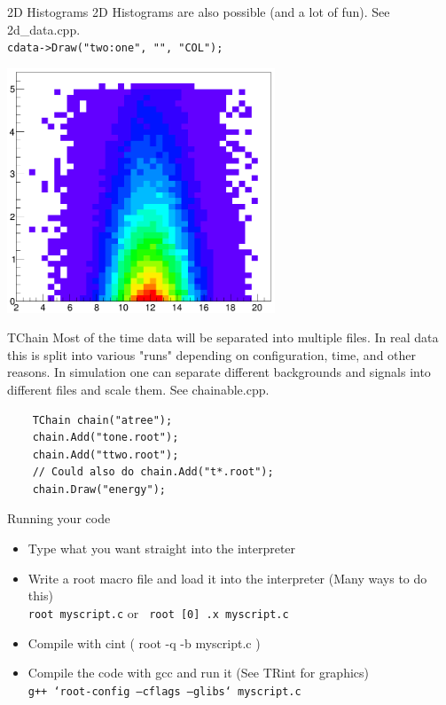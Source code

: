 \documentclass[xcolor=svgnames]{beamer}
\begin{document}
\begin{frame}{2D Histograms}
  2D Histograms are also possible (and a lot of fun). See 2d\_data.cpp.\\
  \lstinline{cdata->Draw("two:one", "", "COL");}
  \begin{center}
    \includegraphics[width=0.6\textwidth]{images/2dhist.png}
  \end{center}
\end{frame}

\begin{frame}[fragile]{TChain}
  Most of the time data will be separated into multiple files. In real data this is split
  into various "runs" depending on configuration, time, and other reasons. In simulation
  one can separate different backgrounds and signals into different files and scale them.
  See chainable.cpp.
  \begin{lstlisting}
    TChain chain("atree");
    chain.Add("tone.root");
    chain.Add("ttwo.root");
    // Could also do chain.Add("t*.root");
    chain.Draw("energy");
  \end{lstlisting}
\end{frame}

\begin{frame}{Running your code}
  \begin{itemize}
  \item Type what you want straight into the interpreter
  \item Write a root macro file and load it into the interpreter (Many ways to do this)\\
    \texttt{root myscript.c} or \texttt{ root [0] .x myscript.c }
  \item Compile with cint ( root -q -b myscript.c )
  \item Compile the code with gcc and run it (See TRint for graphics)\\
    \texttt{g++ `root-config --cflags --glibs` myscript.c }
  \end{itemize}
\end{frame}
\end{document}
